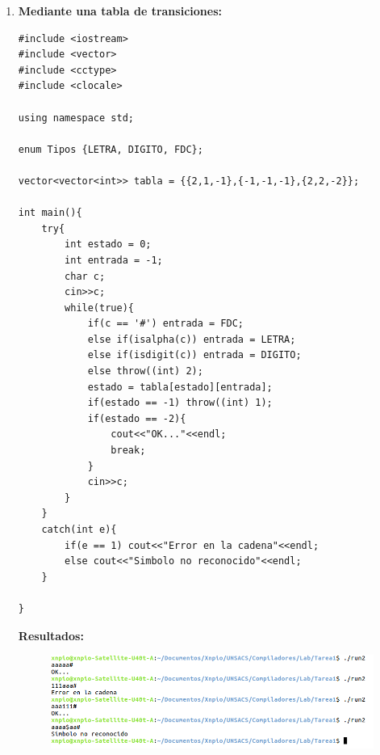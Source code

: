 \documentclass[a4paper,12pt]{article}
\begin{document}
\begin{enumerate}
\item \textbf{Mediante una tabla de transiciones:}

\begin{lstlisting}
#include <iostream>
#include <vector>
#include <cctype>
#include <clocale>

using namespace std;

enum Tipos {LETRA, DIGITO, FDC};

vector<vector<int>> tabla = {{2,1,-1},{-1,-1,-1},{2,2,-2}};

int main(){
	try{
		int estado = 0;
		int entrada = -1;
		char c;
		cin>>c;
		while(true){
			if(c == '#') entrada = FDC;
			else if(isalpha(c)) entrada = LETRA;
			else if(isdigit(c)) entrada = DIGITO;
			else throw((int) 2);
			estado = tabla[estado][entrada];
			if(estado == -1) throw((int) 1);
			if(estado == -2){
				cout<<"OK..."<<endl;
				break;
			}
			cin>>c;
		}
	}
	catch(int e){
		if(e == 1) cout<<"Error en la cadena"<<endl;
		else cout<<"Simbolo no reconocido"<<endl;
	}

}
\end{lstlisting}

\textbf{Resultados:}

\begin{figure}[H]
 \centering
 \includegraphics[scale = 0.5]{2.png}
\end{figure}



\end{enumerate}
\end{document}
